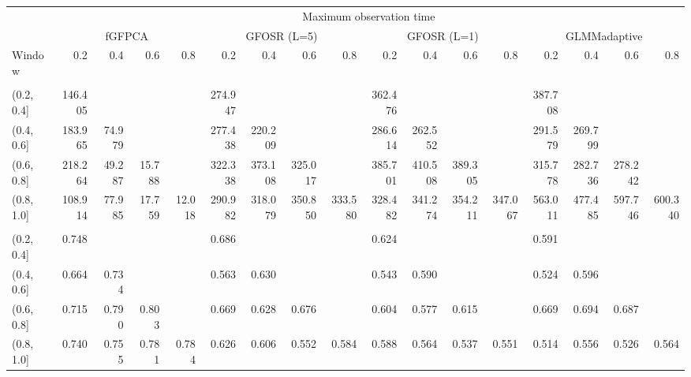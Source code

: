 \documentclass[
]{article}
\begin{document}
\begin{landscape}
\begin{longtable}[t]{lrrrrrrrrrrrrrrrr}
\toprule
\multicolumn{1}{c}{ } & \multicolumn{16}{c}{Maximum observation time} \\
\cmidrule(l{3pt}r{3pt}){2-17}
\multicolumn{1}{c}{ } & \multicolumn{4}{c}{fGFPCA} & \multicolumn{4}{c}{GFOSR (L=5)} & \multicolumn{4}{c}{GFOSR (L=1)} & \multicolumn{4}{c}{GLMMadaptive} \\
\cmidrule(l{3pt}r{3pt}){2-5} \cmidrule(l{3pt}r{3pt}){6-9} \cmidrule(l{3pt}r{3pt}){10-13} \cmidrule(l{3pt}r{3pt}){14-17}
Window & 0.2 & 0.4 & 0.6 & 0.8 & 0.2 & 0.4 & 0.6 & 0.8 & 0.2 & 0.4 & 0.6 & 0.8 & 0.2 & 0.4 & 0.6 & 0.8\\
\midrule
\addlinespace[0.3em]
\multicolumn{17}{l}{\textbf{ISE}}\\
\hspace{1em}(0.2, 0.4] & 146.405 &  &  &  & 274.947 &  &  &  & 362.476 &  &  &  & 387.708 &  &  & \\
\hspace{1em}(0.4, 0.6] & 183.965 & 74.979 &  &  & 277.438 & 220.209 &  &  & 286.614 & 262.552 &  &  & 291.579 & 269.799 &  & \\
\hspace{1em}(0.6, 0.8] & 218.264 & 49.287 & 15.788 &  & 322.338 & 373.108 & 325.017 &  & 385.701 & 410.508 & 389.305 &  & 315.778 & 282.736 & 278.242 & \\
\hspace{1em}(0.8, 1.0] & 108.914 & 77.985 & 17.759 & 12.018 & 290.982 & 318.079 & 350.850 & 333.580 & 328.482 & 341.274 & 354.211 & 347.067 & 563.011 & 477.485 & 597.746 & 600.340\\
\addlinespace[0.3em]
\multicolumn{17}{l}{\textbf{AUC}}\\
\hspace{1em}(0.2, 0.4] & 0.748 &  &  &  & 0.686 &  &  &  & 0.624 &  &  &  & 0.591 &  &  & \\
\hspace{1em}(0.4, 0.6] & 0.664 & 0.734 &  &  & 0.563 & 0.630 &  &  & 0.543 & 0.590 &  &  & 0.524 & 0.596 &  & \\
\hspace{1em}(0.6, 0.8] & 0.715 & 0.790 & 0.803 &  & 0.669 & 0.628 & 0.676 &  & 0.604 & 0.577 & 0.615 &  & 0.669 & 0.694 & 0.687 & \\
\hspace{1em}(0.8, 1.0] & 0.740 & 0.755 & 0.781 & 0.784 & 0.626 & 0.606 & 0.552 & 0.584 & 0.588 & 0.564 & 0.537 & 0.551 & 0.514 & 0.556 & 0.526 & 0.564\\
\bottomrule
\end{longtable}
\end{landscape}
\end{document}

